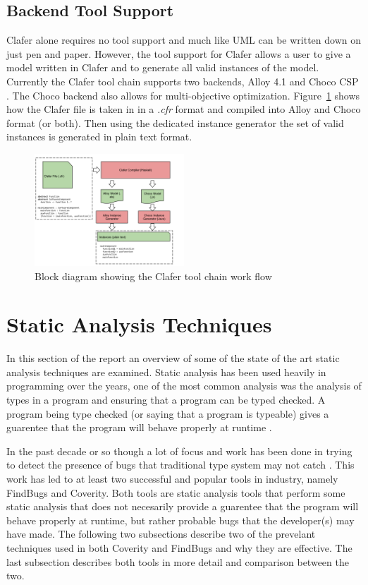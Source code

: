 \documentclass[10pt,oneside]{IEEEtran}
\begin{document}
\subsection{Backend Tool Support}
Clafer alone requires no tool support and much like UML can be written down on just pen and paper.
However, the tool support for Clafer allows a user to give a model written in Clafer and to generate
all valid instances of the model. Currently the Clafer tool chain supports two backends, Alloy 4.1
\cite{4} and Choco CSP \cite{3}. The Choco backend also allows for
multi-objective optimization. Figure~\ref{fig:claferToolChain} shows how the Clafer file is taken in in a \textit{.cfr} format and compiled into Alloy and Choco format (or both). Then using the dedicated instance generator the set of valid instances is generated in plain text format.
\begin{figure}[h]
  \label{fig:claferToolChain}
  \caption{Block diagram showing the Clafer tool chain work flow}
  \centering
  \includegraphics[width=0.5\textwidth]{ClaferToolChainWorkFlow}
\end{figure}

\section{Static Analysis Techniques}
In this section of the report an overview of some of the state of the art static analysis techniques
are examined. Static analysis has been used heavily in programming over the years, one of the most
common analysis was the analysis of types in a program and ensuring that a program can be typed checked.
A program being type checked (or saying that a program is typeable) gives a guarentee that the program
will behave properly at runtime \cite{2}.

In the past decade or so though a lot of focus and work has been done in trying to detect the presence of bugs that traditional type system may not catch \cite{8}. This work has led to at least two successful and popular tools in industry, namely FindBugs and Coverity. Both tools are static analysis tools that perform some static analysis that does not necesarily provide a guarentee that the program will behave properly at runtime, but rather probable bugs that the developer(s) may have made. The following two subsections describe two of the prevelant techniques used in both Coverity and FindBugs and why they are effective. The last subsection describes both tools in more detail and comparison between the two.
\end{document}
